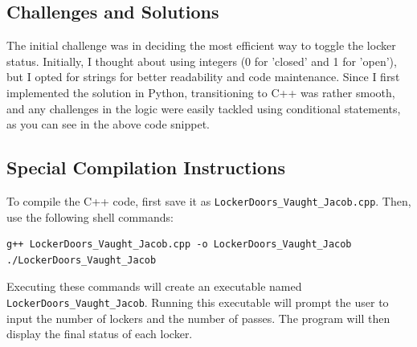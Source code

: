\documentclass{article}
\begin{document}
\subsection*{Challenges and Solutions}
The initial challenge was in deciding the most efficient way to toggle the locker status. Initially, I thought about using integers (0 for 'closed' and 1 for 'open'), but I opted for strings for better readability and code maintenance. Since I first implemented the solution in Python, transitioning to C++ was rather smooth, and any challenges in the logic were easily tackled using conditional statements, as you can see in the above code snippet.

\subsection*{Special Compilation Instructions}
To compile the C++ code, first save it as \texttt{LockerDoors\_Vaught\_Jacob.cpp}. Then, use the following shell commands:

\begin{verbatim}
g++ LockerDoors_Vaught_Jacob.cpp -o LockerDoors_Vaught_Jacob
./LockerDoors_Vaught_Jacob
\end{verbatim}
Executing these commands will create an executable named \texttt{LockerDoors\_Vaught\_Jacob}. Running this executable will prompt the user to input the number of lockers and the number of passes. The program will then display the final status of each locker.
\end{document}
